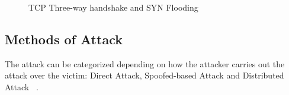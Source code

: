 \begin{figure}[htb]
	\centering
	\hfill
	\caption{TCP Three-way handshake and SYN Flooding} 
	\label{fig:TCPConnections}
\end{figure}



\subsection{Methods of Attack}
\label{subsec:SYNMethodsOfAttacks}

The attack can be categorized depending on how the attacker carries out the attack over the victim: Direct Attack, Spoofed-based Attack and Distributed Attack ~\cite{CiscoTCPSYN}.

